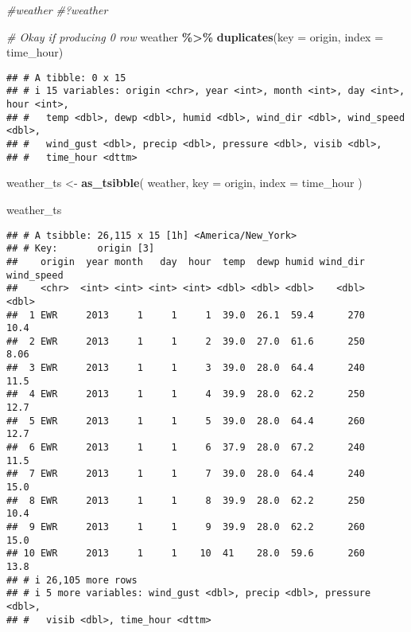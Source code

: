 \documentclass[
]{article}
\newenvironment{Shaded}{\begin{snugshade}}{\end{snugshade}}
\newcommand{\AttributeTok}[1]{\textcolor[rgb]{0.13,0.29,0.53}{#1}}
\newcommand{\CommentTok}[1]{\textcolor[rgb]{0.56,0.35,0.01}{\textit{#1}}}
\newcommand{\FunctionTok}[1]{\textcolor[rgb]{0.13,0.29,0.53}{\textbf{#1}}}
\newcommand{\NormalTok}[1]{#1}
\newcommand{\OtherTok}[1]{\textcolor[rgb]{0.56,0.35,0.01}{#1}}
\newcommand{\SpecialCharTok}[1]{\textcolor[rgb]{0.81,0.36,0.00}{\textbf{#1}}}
\begin{document}
\begin{Shaded}
\begin{Highlighting}[]
\CommentTok{\#weather}
\CommentTok{\#?weather}

\CommentTok{\# Okay if producing 0 row}
\NormalTok{weather }\SpecialCharTok{\%\textgreater{}\%}
  \FunctionTok{duplicates}\NormalTok{(}\AttributeTok{key =}\NormalTok{ origin, }\AttributeTok{index =}\NormalTok{ time\_hour)}
\end{Highlighting}
\end{Shaded}

\begin{verbatim}
## # A tibble: 0 x 15
## # i 15 variables: origin <chr>, year <int>, month <int>, day <int>, hour <int>,
## #   temp <dbl>, dewp <dbl>, humid <dbl>, wind_dir <dbl>, wind_speed <dbl>,
## #   wind_gust <dbl>, precip <dbl>, pressure <dbl>, visib <dbl>,
## #   time_hour <dttm>
\end{verbatim}

\begin{Shaded}
\begin{Highlighting}[]
\NormalTok{weather\_ts }\OtherTok{\textless{}{-}} 
  \FunctionTok{as\_tsibble}\NormalTok{(}
\NormalTok{    weather,}
    \AttributeTok{key =}\NormalTok{ origin,}
    \AttributeTok{index =}\NormalTok{ time\_hour}
\NormalTok{  )}

\NormalTok{weather\_ts}
\end{Highlighting}
\end{Shaded}

\begin{verbatim}
## # A tsibble: 26,115 x 15 [1h] <America/New_York>
## # Key:       origin [3]
##    origin  year month   day  hour  temp  dewp humid wind_dir wind_speed
##    <chr>  <int> <int> <int> <int> <dbl> <dbl> <dbl>    <dbl>      <dbl>
##  1 EWR     2013     1     1     1  39.0  26.1  59.4      270      10.4 
##  2 EWR     2013     1     1     2  39.0  27.0  61.6      250       8.06
##  3 EWR     2013     1     1     3  39.0  28.0  64.4      240      11.5 
##  4 EWR     2013     1     1     4  39.9  28.0  62.2      250      12.7 
##  5 EWR     2013     1     1     5  39.0  28.0  64.4      260      12.7 
##  6 EWR     2013     1     1     6  37.9  28.0  67.2      240      11.5 
##  7 EWR     2013     1     1     7  39.0  28.0  64.4      240      15.0 
##  8 EWR     2013     1     1     8  39.9  28.0  62.2      250      10.4 
##  9 EWR     2013     1     1     9  39.9  28.0  62.2      260      15.0 
## 10 EWR     2013     1     1    10  41    28.0  59.6      260      13.8 
## # i 26,105 more rows
## # i 5 more variables: wind_gust <dbl>, precip <dbl>, pressure <dbl>,
## #   visib <dbl>, time_hour <dttm>
\end{verbatim}
\end{document}
